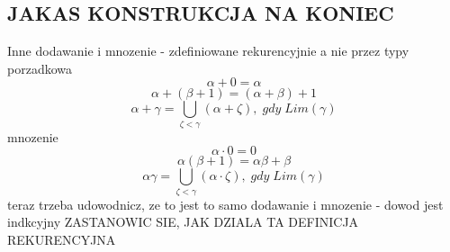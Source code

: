 \documentclass{article}
\begin{document}
    \subsection*{JAKAS KONSTRUKCJA NA KONIEC}
    Inne dodawanie i mnozenie - zdefiniowane rekurencyjnie a nie przez typy porzadkowa
    $$\alpha+0=\alpha$$
    $$\alpha+(\beta+1) = (\alpha+\beta)+1$$
    $$\alpha+\gamma=\bigcup\limits_{\zeta<\gamma}(\alpha+\zeta), \;gdy\;Lim(\gamma)$$
    mnozenie
    $$\alpha\cdot0=0$$
    $$\alpha(\beta+1)=\alpha\beta+\beta$$
    $$\alpha\gamma=\bigcup\limits_{\zeta<\gamma}(\alpha\cdot\zeta),\;gdy\;Lim(\gamma)$$
    teraz trzeba udowodnicz, ze to jest to samo dodawanie i mnozenie - dowod jest indkcyjny
    ZASTANOWIC SIE, JAK DZIALA TA DEFINICJA REKURENCYJNA
\end{document}
